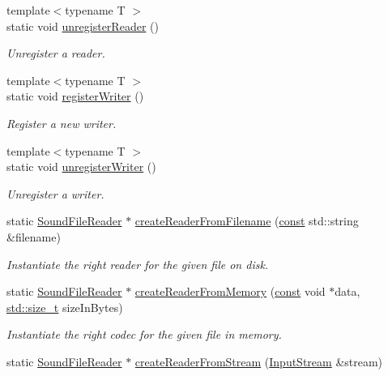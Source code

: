 \begin{DoxyCompactItemize}
{\footnotesize template$<$typename T $>$ }\\static void \hyperlink{classsf_1_1_sound_file_factory_ac42f01faf678d1f410e1ce8a18e4cebb}{unregister\-Reader} ()
\begin{DoxyCompactList}\small\item\em Unregister a reader. \end{DoxyCompactList}\item 
{\footnotesize template$<$typename T $>$ }\\static void \hyperlink{classsf_1_1_sound_file_factory_abb6e082ea3fedf22c8648113d1be5755}{register\-Writer} ()
\begin{DoxyCompactList}\small\item\em Register a new writer. \end{DoxyCompactList}\item 
{\footnotesize template$<$typename T $>$ }\\static void \hyperlink{classsf_1_1_sound_file_factory_a1bd8ebd264a5ec33962a9f7a8ca21a60}{unregister\-Writer} ()
\begin{DoxyCompactList}\small\item\em Unregister a writer. \end{DoxyCompactList}\item 
static \hyperlink{classsf_1_1_sound_file_reader}{Sound\-File\-Reader} $\ast$ \hyperlink{classsf_1_1_sound_file_factory_af0a87110e0b8a77aada17b22a016c066}{create\-Reader\-From\-Filename} (\hyperlink{term__entry_8h_a57bd63ce7f9a353488880e3de6692d5a}{const} std\-::string \&filename)
\begin{DoxyCompactList}\small\item\em Instantiate the right reader for the given file on disk. \end{DoxyCompactList}\item 
static \hyperlink{classsf_1_1_sound_file_reader}{Sound\-File\-Reader} $\ast$ \hyperlink{classsf_1_1_sound_file_factory_aee7a0ff1eace98d5325eaadc7d26d50c}{create\-Reader\-From\-Memory} (\hyperlink{term__entry_8h_a57bd63ce7f9a353488880e3de6692d5a}{const} void $\ast$data, \hyperlink{nc__alloc_8h_a7b60c5629e55e8ec87a4547dd4abced4}{std\-::size\-\_\-t} size\-In\-Bytes)
\begin{DoxyCompactList}\small\item\em Instantiate the right codec for the given file in memory. \end{DoxyCompactList}\item 
static \hyperlink{classsf_1_1_sound_file_reader}{Sound\-File\-Reader} $\ast$ \hyperlink{classsf_1_1_sound_file_factory_a8d4b1f225b72a128ddba3be22f7ba5a2}{create\-Reader\-From\-Stream} (\hyperlink{classsf_1_1_input_stream}{Input\-Stream} \&stream)

\end{DoxyCompactItemize}
